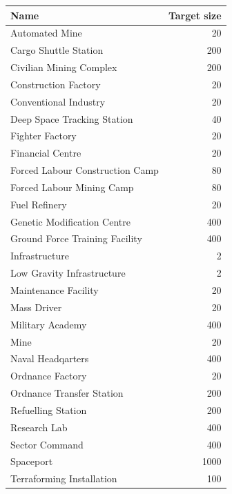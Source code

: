 \documentclass[../Aurora C# unofficial manual.tex]{subfiles}
\begin{document}
	\begin{center}
		\begin{tabular}{|l|r|}
			\hline
			\textbf{Name} & \textbf{Target size} \\
			\hline
			Automated Mine & 20 \\
			\hline
			Cargo Shuttle Station & 200 \\
			\hline
			Civilian Mining Complex & 200 \\
			\hline
			Construction Factory & 20 \\
			\hline
			Conventional Industry & 20 \\
			\hline
			Deep Space Tracking Station & 40 \\
			\hline
			Fighter Factory & 20 \\
			\hline
			Financial Centre & 20 \\
			\hline
			Forced Labour Construction Camp & 80 \\
			\hline
			Forced Labour Mining Camp & 80 \\
			\hline
			Fuel Refinery & 20 \\
			\hline
			Genetic Modification Centre & 400 \\
			\hline
			Ground Force Training Facility & 400 \\
			\hline
			Infrastructure & 2 \\
			\hline
			Low Gravity Infrastructure & 2 \\
			\hline
			Maintenance Facility & 20 \\
			\hline
			Mass Driver & 20 \\
			\hline
			Military Academy & 400 \\
			\hline
			Mine & 20 \\
			\hline
			Naval Headqarters & 400 \\
			\hline
			Ordnance Factory & 20 \\
			\hline
			Ordnance Transfer Station & 200 \\
			\hline
			Refuelling Station & 200 \\
			\hline
			Research Lab & 400 \\
			\hline
			Sector Command & 400 \\
			\hline
			Spaceport & 1000 \\
			\hline
			Terraforming Installation & 100 \\
			\hline
		\end{tabular}
	\end{center}
\end{document}
